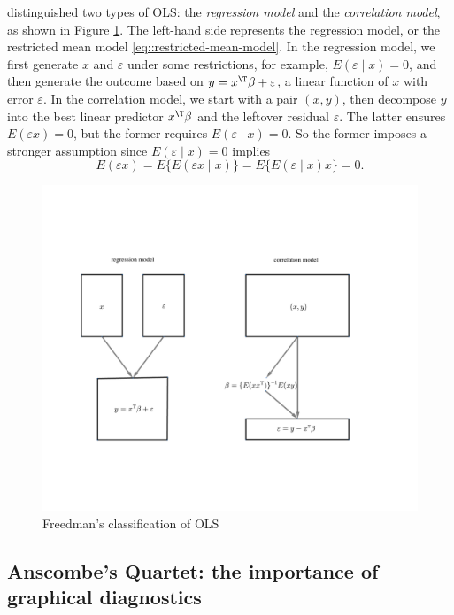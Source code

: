 \citet{freedman1981bootstrapping} distinguished two types of OLS: the {\it regression model} and the {\it correlation model}, as shown in Figure \ref{fig::freedman-classification}. The left-hand side represents the regression model, or the restricted mean model \eqref{eq::restricted-mean-model}. In the regression model, we first generate $x$ and $\varepsilon$ under some restrictions, for example, $E(\varepsilon\mid x) = 0$, and then generate the outcome based on $y=x^{\T} \beta + \varepsilon$, a linear function of $x$ with error $\varepsilon$. In the correlation model, we start with a pair $(x,y)$, then decompose $y$ into the best linear predictor $x^{\T} \beta $ and the leftover residual $\varepsilon$. The latter ensures $E(\varepsilon x) = 0$, but the former requires $E(\varepsilon\mid x) = 0$. So the former imposes a stronger assumption since $E(\varepsilon\mid x) = 0$ implies
$$
E(\varepsilon x) = E\{E(\varepsilon x \mid x)  \} =  E\{E(\varepsilon  \mid x)  x \}  = 0. 
$$

\begin{figure}[th]
\centering
\includegraphics[width = \textwidth]{figures/twoolsfreedman.pdf}
\caption{Freedman's classification of OLS}\label{fig::freedman-classification}
\end{figure}




\subsection{Anscombe's Quartet: the importance of graphical diagnostics}
\label{sec::anscombe-quartet}


